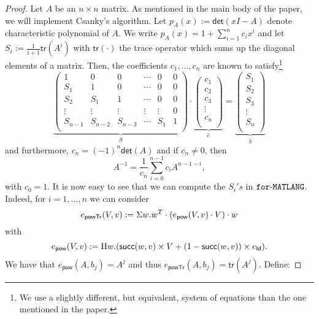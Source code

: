 \begin{proof}
    Let $A$ be an $n \times n$ matrix. As mentioned in the main body of the paper, we will implement Csanky's algorithm. Let $p_A(x):=\mathsf{det}(xI-A)$ denote  characteristic polynomial of $A$.  We write $p_A(x)=1 + \sum_{i=1}^n c_ix^i$ and let  $S_i:=\frac{1}{i+1}\mathsf{tr}(A^i)$ with $\mathsf{tr}(\cdot)$ the trace operator which sums up the diagonal elements of a matrix.
    Then, the coefficients $c_1,\ldots,c_n$ are known to satisfy\footnote{We use a slightly different, but equivalent, system of equations than the one mentioned in the paper.} 
    $$
    \underbrace{\left(\begin{matrix}
    1 & 0 & 0 & \cdots & 0 & 0\\
    S_1 & 1 & 0 & \cdots  &0 & 0\\
    S_2 & S_1 & 1 & \cdots  &0 & 0\\
    \vdots & \vdots & \vdots & \vdots & \vdots & 0\\
    S_{n-1} & S_{n-2} & S_{n-3} & \cdots & S_1 & 1\\
    \end{matrix}\right)}_{S}\cdot
    \underbrace{\left(\begin{matrix}
    c_1\\
    c_2\\
    c_3\\
    \vdots\\
    c_n\\
    \end{matrix}\right)}_{\bar c}=\underbrace{\left(\begin{matrix}
    S_1\\
    S_2\\
    S_3\\
    \vdots\\
    S_n\\
    \end{matrix}\right)}_{\bar b}
    $$
    and furthermore, $c_n=(-1)^n\mathsf{det}(A)$ and if $c_{n}\neq 0$, then
    $$
    A^{-1}=\frac{1}{c_n}\sum_{i=0}^{n-1}c_i A^{n-1-i},
    $$
    with $c_0=1$. It is now easy to see that we can compute the $S_i's$ in $\texttt{for}\text{-}\texttt{MATLANG}$. Indeed, for
    $i=1,\ldots,n$ we can consider
    $$
    e_{\mathsf{powTr}}(V,v):=\Sigma w. w^T\cdot\left(e_{\mathsf{pow}}(V,v)\cdot V\right)\cdot w
    $$
    with 
    $$
    e_{\mathsf{pow}}(V,v):= \Pi w. (\mathsf{succ}(w,v)\times V+(1-\mathsf{succ}(w,v))\times e_{\mathsf{Id}}).
    $$
    We have that $e_{\mathsf{pow}}(A,b_j)=A^{j}$ and thus $e_{\mathsf{powTr}}(A,b_j)=\mathsf{tr}(A^{j})$. Define:

\end{proof}
